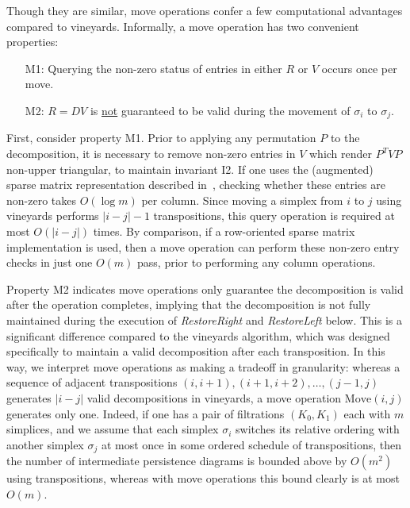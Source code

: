 \documentclass{article} %
\begin{document}
Though they are similar, move operations confer a few computational advantages compared to vineyards. Informally, a move operation has two convenient properties:
\\	
 \begin{enumerate}[labelsep=5pt, topsep=0pt,itemsep=-0.25ex,parsep=1.2ex]
 	\item[M1:] Querying the non-zero status of entries in either $R$ or $V$ occurs once per move.
 	\item[M2:] $R = D V$ is \underline{not} guaranteed to be valid  during the movement of $\sigma_i $ to $ \sigma_j$.
 \end{enumerate} 
 \vspace*{1em}
First, consider property M1. Prior to applying any permutation $P$ to the decomposition, it is necessary to remove non-zero entries in $V$ which render $P^TVP$ non-upper triangular, to maintain invariant I2. 
If one uses the (augmented) sparse matrix representation described in~\cite{cohen2006vines}, checking whether these entries are non-zero takes $O(\log m)$ per column. Since moving a simplex from $i$ to $j$ using vineyards performs $\lvert i - j \rvert - 1$ transpositions, this query operation is required at most $O(\lvert i - j \rvert)$ times.
By comparison, if a row-oriented sparse matrix implementation is used, then a move operation can perform these non-zero entry checks in just one $O(m)$ pass, prior to performing any column operations. 

Property M2 indicates move operations only guarantee the decomposition is valid after the operation completes, implying that the decomposition is not fully maintained during the execution of \textit{RestoreRight} and \textit{RestoreLeft} below. 
This is a significant difference compared to the vineyards algorithm, which was designed specifically to maintain a valid decomposition after each transposition. 
In this way, we interpret move operations as making a tradeoff in granularity: whereas a sequence of adjacent transpositions $(i, i{+}1), (i{+}1, i{+}2), \dots, (j{-}1, j)$ generates $\lvert i - j \rvert $ valid decompositions in vineyards, a move operation $\mathrm{Move}(i,j)$ generates only one.
Indeed, if one has a pair of filtrations $(K_0, K_1)$ each with $m$ simplices, and we assume that each simplex $\sigma_i$ switches its relative ordering with another simplex $\sigma_j$ at most once in some ordered schedule of transpositions, then the number of intermediate persistence diagrams is bounded above by $O(m^2)$ using transpositions, whereas with move operations this bound clearly is at most $O(m)$.  \\ 
\end{document}
